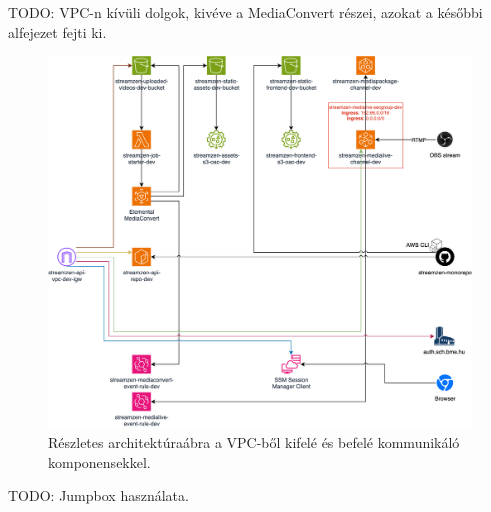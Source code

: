 TODO: VPC-n kívüli dolgok, kivéve a MediaConvert részei, azokat a későbbi alfejezet fejti ki.

\begin{figure}[ht]
  \centering
  \includegraphics[width=150mm, keepaspectratio]{figures/dipterv_nonvpc.png}
  \caption{Részletes architektúraábra a VPC-ből kifelé és befelé kommunikáló komponensekkel.}
  \label{fig:nonvpc}
\end{figure}

TODO: Jumpbox használata.

